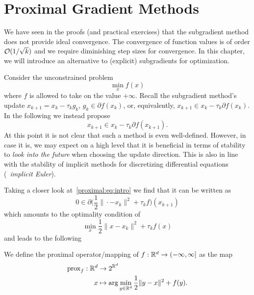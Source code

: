 \chapter{Proximal Gradient Methods}

We have seen in the proofs (and practical exercises) that the subgradient method does not provide ideal convergence. The convergence of function values is of order $\mathcal{O}(1/\sqrt{k})$ and we require diminishing step sizes for convergence. In this chapter, we will introduce an alternative to (explicit) subgradients for optimization.

Consider the unconstrained problem
\begin{equation}\label{proximal:eq:problem}
    \min_x f(x)
\end{equation}
where $f$ is allowed to take on the value $+\infty$. Recall the subgradient method's update $x_{k+1} = x_k - \tau_k g_k$, $g_k\in\partial f(x_k)$, or, equivalently, $x_{k+1}\in x_k -\tau_k\partial f(x_k)$. In the following we instead propose
\begin{equation}\label{proximal:eq:intro}
    x_{k+1}\in x_k - \tau_k\partial f(x_{k+1}).
\end{equation}
At this point it is not clear that such a method is even well-defined. However, in case it is, we may expect on a high level that it is beneficial in terms of stability to \emph{look into the future} when choosing the update direction. This is also in line with the stability of implicit methods for discretizing differential equations (\cf~\emph{implicit Euler}).

Taking a closer look at~\eqref{proximal:eq:intro} we find that it can be written as
\begin{equation}
    0 \in \partial \biggl(\frac{1}{2}\|\cdot - x_k\|^2 + \tau_k f\biggr)(x_{k+1})
\end{equation}
which amounts to the optimality condition of
\begin{equation}
    \min_x \frac{1}{2}\|x - x_k\|^2 + \tau_k f(x)
\end{equation}
and leads to the following
\begin{defn}
    We define the proximal operator/mapping of $f:\mathbb{R}^d\rightarrow (-\infty,\infty]$ as the map
    \begin{equation}
        \begin{aligned}
            \mathrm{prox}_{f}:\mathbb{R}^d&\rightarrow 2^{\mathbb{R}^d}\\
            x&\mapsto \arg\min_{y\in\mathbb{R}^d}\frac{1}{2}\|y - x\|^2 + f(y).
        \end{aligned}
    \end{equation}
\end{defn}

